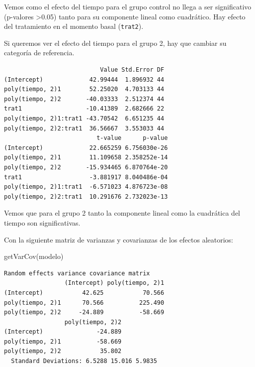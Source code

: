 \documentclass[
]{book}
\newenvironment{Shaded}{\begin{snugshade}}{\end{snugshade}}
\newcommand{\DecValTok}[1]{\textcolor[rgb]{0.00,0.00,0.81}{#1}}
\newcommand{\FunctionTok}[1]{\textcolor[rgb]{0.00,0.00,0.00}{#1}}
\newcommand{\NormalTok}[1]{#1}
\newcommand{\OtherTok}[1]{\textcolor[rgb]{0.56,0.35,0.01}{#1}}
\newcommand{\SpecialCharTok}[1]{\textcolor[rgb]{0.00,0.00,0.00}{#1}}
\begin{document}
Vemos como el efecto del tiempo para el grupo control no llega a ser significativo (p-valores \textgreater0.05) tanto para su componente lineal como cuadrático. Hay efecto del tratamiento en el momento basal (\texttt{trat2}).

Si queremos ver el efecto del tiempo para el grupo 2, hay que cambiar su categoría de referencia.

\begin{Shaded}
\end{Shaded}

\begin{verbatim}
                           Value Std.Error DF
(Intercept)             42.99444  1.896932 44
poly(tiempo, 2)1        52.25020  4.703133 44
poly(tiempo, 2)2       -40.03333  2.512374 44
trat1                  -10.41389  2.682666 22
poly(tiempo, 2)1:trat1 -43.70542  6.651235 44
poly(tiempo, 2)2:trat1  36.56667  3.553033 44
                          t-value      p-value
(Intercept)             22.665259 6.756030e-26
poly(tiempo, 2)1        11.109658 2.358252e-14
poly(tiempo, 2)2       -15.934465 6.870764e-20
trat1                   -3.881917 8.040486e-04
poly(tiempo, 2)1:trat1  -6.571023 4.876723e-08
poly(tiempo, 2)2:trat1  10.291676 2.732023e-13
\end{verbatim}

Vemos que para el grupo 2 tanto la componente lineal como la cuadrática del tiempo son significativas.

Con la siguiente matriz de varianzas y covarianzas de los efectos aleatorios:

\begin{Shaded}
\begin{Highlighting}[]
\FunctionTok{getVarCov}\NormalTok{(modelo)}
\end{Highlighting}
\end{Shaded}

\begin{verbatim}
Random effects variance covariance matrix
                 (Intercept) poly(tiempo, 2)1
(Intercept)           42.625           70.566
poly(tiempo, 2)1      70.566          225.490
poly(tiempo, 2)2     -24.889          -58.669
                 poly(tiempo, 2)2
(Intercept)               -24.889
poly(tiempo, 2)1          -58.669
poly(tiempo, 2)2           35.802
  Standard Deviations: 6.5288 15.016 5.9835 
\end{verbatim}
\end{document}
